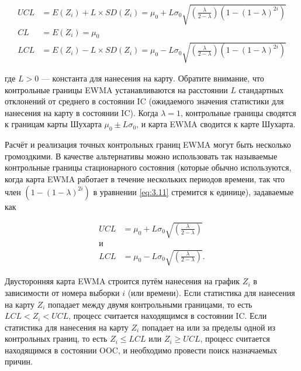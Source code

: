 \begin{equation}
	\begin{aligned}
		UCL &= E(Z_i) + L \times SD(Z_i) = \mu_0 + L\sigma_0\sqrt{\left(\frac{\lambda}{2 - \lambda}\right)(1 - (1 - \lambda)^{2i})} \\
		CL &= E(Z_i) = \mu_0 \\
		LCL &= E(Z_i) - L \times SD(Z_i) = \mu_0 - L\sigma_0\sqrt{\left(\frac{\lambda}{2 - \lambda}\right)(1 - (1 - \lambda)^{2i})}
	\end{aligned}
	\label{eq:3.11}
\end{equation}

где \(L > 0\) — константа для нанесения на карту. Обратите внимание, что контрольные границы EWMA устанавливаются на расстоянии \(L\) стандартных отклонений от среднего в состоянии IC (ожидаемого значения статистики для нанесения на карту в состоянии IC). Когда \(\lambda = 1\), контрольные границы сводятся к границам карты Шухарта \(\mu_0 \pm L\sigma_0\), и карта EWMA сводится к карте Шухарта.

Расчёт и реализация точных контрольных границ EWMA могут быть несколько громоздкими. В качестве альтернативы можно использовать так называемые контрольные границы стационарного состояния (которые обычно используются, когда карта EWMA работает в течение нескольких периодов времени, так что член \((1 - (1 - \lambda)^{2i})\) в уравнении \eqref{eq:3.11} стремится к единице), задаваемые как

\begin{equation}
	\begin{aligned}
		UCL &= \mu_0 + L\sigma_0\sqrt{\left(\frac{\lambda}{2 - \lambda}\right)} \\
		\text{и} \\
		LCL &= \mu_0 - L\sigma_0\sqrt{\left(\frac{\lambda}{2 - \lambda}\right)}.
	\end{aligned}
	\label{eq:3.12}
\end{equation}

Двусторонняя карта EWMA строится путём нанесения на график \(Z_i\) в зависимости от номера выборки \(i\) (или времени). Если статистика для нанесения на карту \(Z_i\) попадает между двумя контрольными границами, то есть \(LCL < Z_i < UCL\), процесс считается находящимся в состоянии IC. Если статистика для нанесения на карту \(Z_i\) попадает на или за пределы одной из контрольных границ, то есть \(Z_i \leq LCL\) или \(Z_i \geq UCL\), процесс считается находящимся в состоянии OOC, и необходимо провести поиск назначаемых причин.

